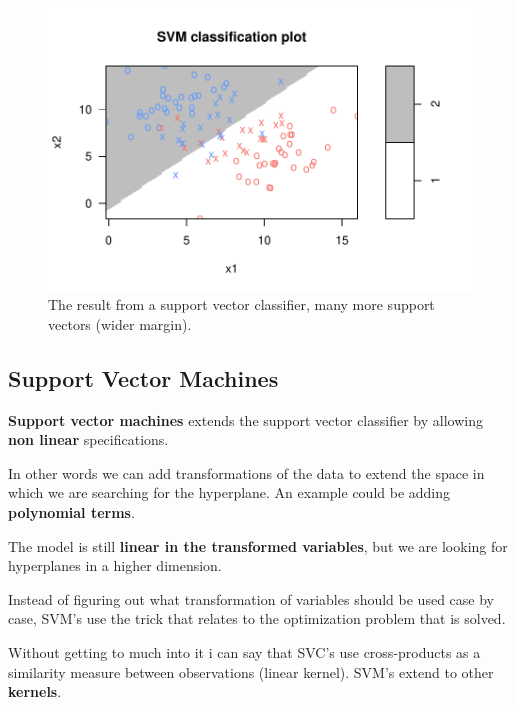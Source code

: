 \documentclass[aspectratio=169,10pt]{beamer}
\begin{document}
\begin{frame}{\secname}{\subsecname}
  \begin{figure}
    \includegraphics[width=.6\textwidth]{scripts/output/support-vector-classifier.pdf}
    \caption{The result from a support vector classifier, many more support vectors (wider margin).}
  \end{figure}
\end{frame}

\subsection{Support Vector Machines}
\begin{frame}{\secname}{\subsecname}
  \textbf{Support vector machines} extends the support vector classifier by allowing \textbf{non linear} specifications.

  In other words we can add transformations of the data to extend the space in which we are searching for the hyperplane. 
  An example could be adding \textbf{polynomial terms}. 

  The model is still \textbf{linear in the transformed variables}, but we are looking for hyperplanes in a higher dimension.

  Instead of figuring out what transformation of variables should be used case by case, SVM's use the trick that relates to the optimization problem that is solved.

  Without getting to much into it i can say that SVC's use cross-products as a similarity measure between observations (linear kernel).
  SVM's extend to other \textbf{kernels}.
\end{frame}
\end{document}
